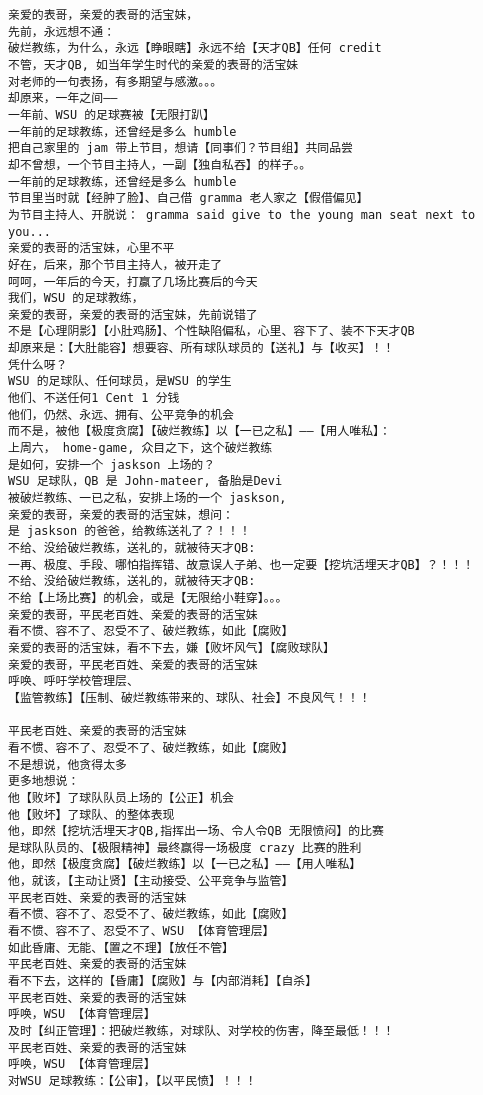 \documentclass[9pt, b5paper]{article}
\begin{document}
\begin{verbatim}
亲爱的表哥，亲爱的表哥的活宝妹，
先前，永远想不通：
破烂教练，为什么，永远【睁眼瞎】永远不给【天才QB】任何 credit
不管，天才QB, 如当年学生时代的亲爱的表哥的活宝妹
对老师的一句表扬，有多期望与感激。。。
却原来，一年之间——
一年前、WSU 的足球赛被【无限打趴】
一年前的足球教练，还曾经是多么 humble
把自己家里的 jam 带上节目，想请【同事们？节目组】共同品尝
却不曾想，一个节目主持人，一副【独自私吞】的样子。。
一年前的足球教练，还曾经是多么 humble
节目里当时就【经肿了脸】、自己借 gramma 老人家之【假借偏见】
为节目主持人、开脱说： gramma said give to the young man seat next to you...
亲爱的表哥的活宝妹，心里不平
好在，后来，那个节目主持人，被开走了
呵呵，一年后的今天，打赢了几场比赛后的今天
我们，WSU 的足球教练，
亲爱的表哥，亲爱的表哥的活宝妹，先前说错了
不是【心理阴影】【小肚鸡肠】、个性缺陷偏私，心里、容下了、装不下天才QB
却原来是：【大肚能容】想要容、所有球队球员的【送礼】与【收买】！！
凭什么呀？
WSU 的足球队、任何球员，是WSU 的学生
他们、不送任何1 Cent 1 分钱
他们，仍然、永远、拥有、公平竞争的机会
而不是，被他【极度贪腐】【破烂教练】以【一已之私】——【用人唯私】：
上周六， home-game, 众目之下，这个破烂教练
是如何，安排一个 jaskson 上场的？
WSU 足球队，QB 是 John-mateer, 备胎是Devi
被破烂教练、一已之私，安排上场的一个 jaskson,
亲爱的表哥，亲爱的表哥的活宝妹，想问：
是 jaskson 的爸爸，给教练送礼了？！！！
不给、没给破烂教练，送礼的，就被待天才QB:
一再、极度、手段、哪怕指挥错、故意误人子弟、也一定要【挖坑活埋天才QB】？！！！
不给、没给破烂教练，送礼的，就被待天才QB:
不给【上场比赛】的机会，或是【无限给小鞋穿】。。。
亲爱的表哥，平民老百姓、亲爱的表哥的活宝妹
看不惯、容不了、忍受不了、破烂教练，如此【腐败】
亲爱的表哥的活宝妹，看不下去，嫌【败坏风气】【腐败球队】
亲爱的表哥，平民老百姓、亲爱的表哥的活宝妹
呼唤、呼吁学校管理层、
【监管教练】【压制、破烂教练带来的、球队、社会】不良风气！！！

平民老百姓、亲爱的表哥的活宝妹
看不惯、容不了、忍受不了、破烂教练，如此【腐败】
不是想说，他贪得太多
更多地想说：
他【败坏】了球队队员上场的【公正】机会
他【败坏】了球队、的整体表现
他，即然【挖坑活埋天才QB,指挥出一场、令人令QB 无限愤闷】的比赛
是球队队员的、【极限精神】最终赢得一场极度 crazy 比赛的胜利
他，即然【极度贪腐】【破烂教练】以【一已之私】——【用人唯私】
他，就该，【主动让贤】【主动接受、公平竞争与监管】
平民老百姓、亲爱的表哥的活宝妹
看不惯、容不了、忍受不了、破烂教练，如此【腐败】
看不惯、容不了、忍受不了、WSU 【体育管理层】
如此昏庸、无能、【置之不理】【放任不管】
平民老百姓、亲爱的表哥的活宝妹
看不下去，这样的【昏庸】【腐败】与【内部消耗】【自杀】
平民老百姓、亲爱的表哥的活宝妹
呼唤，WSU 【体育管理层】
及时【纠正管理】：把破烂教练，对球队、对学校的伤害，降至最低！！！
平民老百姓、亲爱的表哥的活宝妹
呼唤，WSU 【体育管理层】
对WSU 足球教练：【公审】，【以平民愤】！！！


\end{verbatim}
\end{document}
